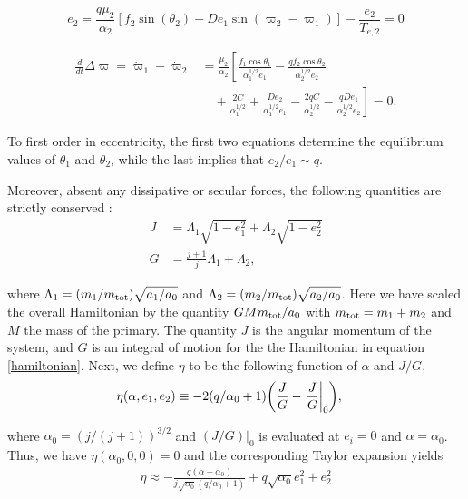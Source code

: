\documentclass[usenatbib,twocolumn]{mnras}
\DeclarePairedDelimiter{\p}{(}{)}
\begin{document}
\begin{equation}
\label{dote2}
  \dot e_2 = \frac{q\mu_2}{\alpha_2} [f_2\sin(\theta_2) - De_1 \sin(\varpi_2-\varpi_1)]- \frac{e_2}{T_{e,2}}=0
\end{equation}

\begin{align}
\label{dotdpom}
  \frac{d}{dt}\Delta\varpi = \dot\varpi_1-\dot\varpi_2
  &= \frac{\mu_2}{\alpha_2} \left[ \frac{f_1\cos\theta_1}{\alpha_1^{1/2} e_1}
     - \frac{qf_2\cos\theta_2}{\alpha_2^{1/2}e_2}\right.\nonumber \\
  &\quad+ \left.\frac{2C}{\alpha_1^{1/2}} + \frac{De_2}{\alpha_1^{1/2} e_1}
    - \frac{2qC}{\alpha_2^{1/2}} - \frac{qDe_1}{ \alpha_2^{1/2}e_2}\right]=0.
\end{align}

\noindent To first order in eccentricity, the first two
equations determine the equilibrium values of \(\theta_1\) and
\(\theta_2\), while the last implies that \(e_2/e_1 \sim q\).

Moreover, absent any dissipative or secular forces, the following
quantities are strictly conserved \citep{xu_migration_2018}:
\begin{align}
  J &= \Lambda_1\sqrt{1-e_1^2} + \Lambda_2\sqrt{1-e_2^2}\\
  G &= \frac{j+1}{j} \Lambda_1 + \Lambda_2,
\end{align}

\noindent where \(\Lambda_1 = (m_1/m_{\rm
tot})\sqrt{a_1/a_0}\) and \(\Lambda_2=(m_2/m_{\rm tot})\sqrt{a_2/a_0}\).
Here we have scaled the overall Hamiltonian by the quantity
\(GMm_{\rm tot}/a_0\) with \(m_{\rm tot}=m_1+m_2\) and \(M\) the mass of
the primary. The quantity \(J\) is the angular
momentum of the system, and \(G\) is an integral of motion for the the
Hamiltonian in equation \eqref{hamiltonian}.
Next, we define \(\eta\) to be the following function of \(\alpha\) and \(J/G\),
\begin{align}
  \eta(\alpha, e_1, e_2) &\equiv - 2(q/\alpha_0+1)\p*{\frac{J}{G}-\left.\frac{J}{G}\right|_{0}},
\end{align}

\noindent
where \(\alpha_0 = (j/(j+1))^{3/2}\) and \(\left.(J/G)\right|_{0}\) is
evaluated at \(e_i=0\) and \(\alpha=\alpha_0\).
Thus, we have \(\eta(\alpha_0, 0, 0)=0\) and the corresponding Taylor expansion yields
\begin{align}
  \eta \approx -\frac{q(\alpha-\alpha_0)}{j\sqrt{\alpha_0}(q/\alpha_0+1)} + q\sqrt{\alpha_0}e_1^2 + e_2^2
\end{align}
\end{document}
